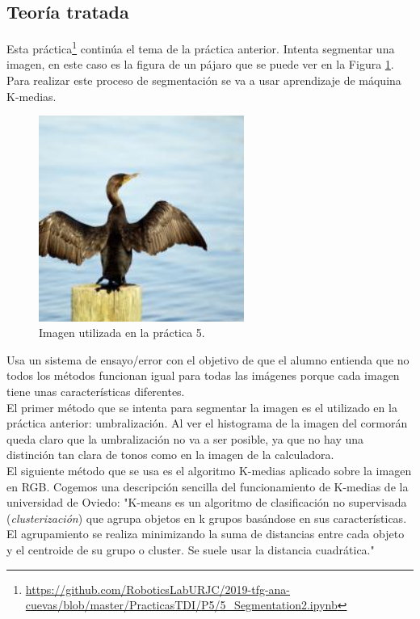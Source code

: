 \subsection{Teoría tratada}

Esta práctica\footnote{\url{https://github.com/RoboticsLabURJC/2019-tfg-ana-cuevas/blob/master/PracticasTDI/P5/5_Segmentation2.ipynb}} continúa el tema de la práctica anterior. Intenta segmentar una imagen, en este caso es la figura de un pájaro que se puede ver en la Figura \ref{cormoran}. Para realizar este proceso de segmentación se va a usar aprendizaje de máquina K-medias.\\
\begin{figure}[h]
\centering
\includegraphics[width=0.6\textwidth]{imagenes/cormoran_rgb}
\caption{Imagen utilizada en la práctica 5.}
\label{cormoran}
\end{figure}

Usa un sistema de ensayo/error con el objetivo de que el alumno entienda que no todos los métodos funcionan igual para todas las imágenes porque cada imagen tiene unas características diferentes.\\

El primer método que se intenta para segmentar la imagen es el utilizado en la práctica anterior: umbralización. Al ver el histograma de la imagen del cormorán queda claro que la umbralización no va a ser posible, ya que no hay una distinción tan clara de tonos como en la imagen de la calculadora.\\

El siguiente método que se usa es el algoritmo K-medias aplicado sobre la imagen en RGB. Cogemos una descripción sencilla del funcionamiento de K-medias de la universidad de Oviedo: "K-means es un algoritmo de clasificación no supervisada (\emph{clusterización}) que agrupa objetos en k grupos basándose en sus características. El agrupamiento se realiza minimizando la suma de distancias entre cada objeto y el centroide de su grupo o cluster. Se suele usar la distancia cuadrática."\\


